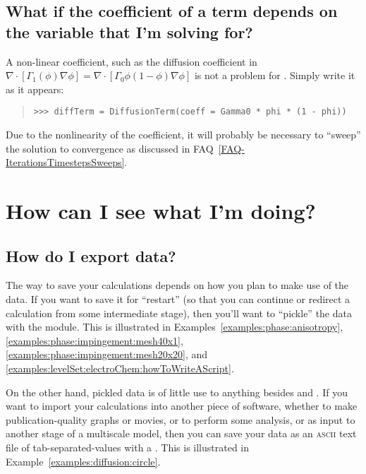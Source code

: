         \subsection{What if the coefficient of a term depends on 
            the variable that I'm solving for?}
            
            A non-linear coefficient, such as the diffusion 
            coefficient in \( 
            \nabla\cdot[\Gamma_1(\phi) \nabla \phi] = 
            \nabla\cdot[\Gamma_0 \phi (1 - \phi) \nabla\phi] \) is 
            not a problem for \FiPy. Simply write it as it appears:
            \begin{quote}
\begin{verbatim}
>>> diffTerm = DiffusionTerm(coeff = Gamma0 * phi * (1 - phi))
\end{verbatim}
            \end{quote}
            \begin{reSTadmonition}[Note]
            Due to the nonlinearity of the coefficient, it will
            probably be necessary to ``sweep'' the solution to
            convergence as discussed in
            FAQ~\ref{FAQ-IterationsTimestepsSweeps}.
            \end{reSTadmonition}


    \section{How can I see what I'm doing?}
    
    \subsection{How do I export data?} The way to save your calculations
    depends on how you plan to make use of the data. If you want to
    save it for ``restart'' (so that you can continue or redirect a
    calculation from some intermediate stage), then you'll want to
    ``pickle'' the \Python{} data with the  module. This
    is illustrated in Examples~\ref{examples:phase:anisotropy},
    \ref{examples:phase:impingement:mesh40x1},
    \ref{examples:phase:impingement:mesh20x20}, and
    \ref{examples:levelSet:electroChem:howToWriteAScript}.
    
    On the other hand, pickled \FiPy{} data is of little use to
    anything besides \Python{} and \FiPy{}. If you want to import your
    calculations into another piece of software, whether to make
    publication-quality graphs or movies, or to perform some analysis,
    or as input to another stage of a multiscale model, then you can
    save your data as an \textsc{ascii} text file of
    tab-separated-values with a . This is 
    illustrated in Example~\ref{examples:diffusion:circle}.
    

